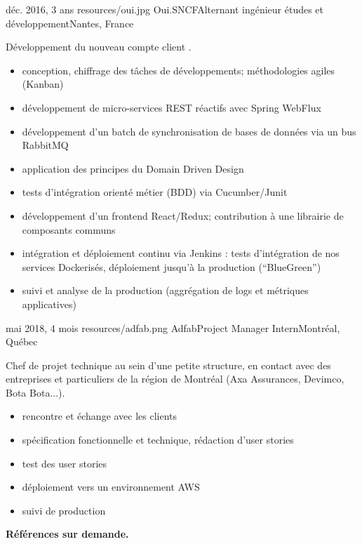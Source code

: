 \documentclass{cv}
\begin{document}
\experience
{{déc. 2016,  3 ans}}
{resources/oui.jpg}
{Oui.SNCF}{Alternant ingénieur études et développement}{Nantes, France}{

Développement du nouveau compte client \ouisncf{}. 

\begin{itemize}
	\item conception, chiffrage des tâches de développements; méthodologies agiles (Kanban)
	\item développement de micro-services REST réactifs avec Spring WebFlux
	\item développement d'un batch de synchronisation de bases de données via un bus RabbitMQ
	\item application des principes du Domain Driven Design
	\item tests d'intégration orienté métier (BDD) via Cucumber/Junit
	\item développement d'un frontend React/Redux; contribution à une librairie de composants communs
	\item intégration et déploiement continu via Jenkins : tests d'intégration de nos services Dockerisés, 
	déploiement jusqu'à la production (``BlueGreen'')
	\item suivi et analyse de la production (aggrégation de logs et métriques applicatives)
\end{itemize}
}

\experience
{{mai 2018,  4 mois}}
{resources/adfab.png}
{Adfab}{Project Manager Intern}{Montréal, Québec}{

Chef de projet technique au sein d'une petite structure, en contact avec des entreprises et particuliers de la région de Montréal (Axa Assurances, Devimco, Bota Bota...).

\begin{itemize}
	\item rencontre et échange avec les clients
	\item spécification fonctionnelle et technique, rédaction d'user stories
	\item test des user stories
	\item déploiement vers un environnement AWS
	\item suivi de production
\end{itemize}
}

\begin{center}
	\bfseries Références sur demande.
\end{center}
\end{document}
